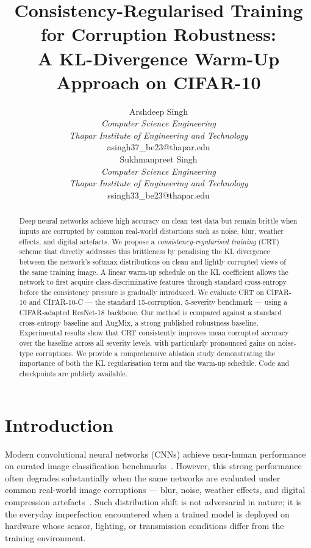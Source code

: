 \documentclass[10pt,twocolumn]{article}
\title{
  \textbf{Consistency-Regularised Training for Corruption Robustness:\\
  A KL-Divergence Warm-Up Approach on CIFAR-10}
}
\author{
Arshdeep Singh\\
\textit{Computer Science Engineering}\\
\textit{Thapar Institute of Engineering and Technology}\\
asingh37\_be23@thapar.edu
\\[1em]
Sukhmanpreet Singh\\
\textit{Computer Science Engineering}\\
\textit{Thapar Institute of Engineering and Technology}\\
ssingh33\_be23@thapar.edu
}
\date{}
\begin{document}
\maketitle

\begin{abstract}
Deep neural networks achieve high accuracy on clean test data but remain brittle when inputs are corrupted by common real-world distortions such as noise, blur, weather effects, and digital artefacts. We propose a \emph{consistency-regularised training} (CRT) scheme that directly addresses this brittleness by penalising the KL divergence between the network's softmax distributions on clean and lightly corrupted views of the same training image. A linear warm-up schedule on the KL coefficient allows the network to first acquire class-discriminative features through standard cross-entropy before the consistency pressure is gradually introduced. We evaluate CRT on CIFAR-10 and CIFAR-10-C --- the standard 15-corruption, 5-severity benchmark --- using a CIFAR-adapted ResNet-18 backbone. Our method is compared against a standard cross-entropy baseline and AugMix, a strong published robustness baseline. Experimental results show that CRT consistently improves mean corrupted accuracy over the baseline across all severity levels, with particularly pronounced gains on noise-type corruptions. We provide a comprehensive ablation study demonstrating the importance of both the KL regularisation term and the warm-up schedule. Code and checkpoints are publicly available.
\end{abstract}

\section{Introduction}

Modern convolutional neural networks (CNNs) achieve near-human performance on curated image classification benchmarks~\cite{khazem2026macs,erichson2024noisymix}. However, this strong performance often degrades substantially when the same networks are evaluated under common real-world image corruptions --- blur, noise, weather effects, and digital compression artefacts~\cite{ranabhat2025shapebias,kumar2026demhec}. Such distribution shift is not adversarial in nature; it is the everyday imperfection encountered when a trained model is deployed on hardware whose sensor, lighting, or transmission conditions differ from the training environment.
\end{document}
